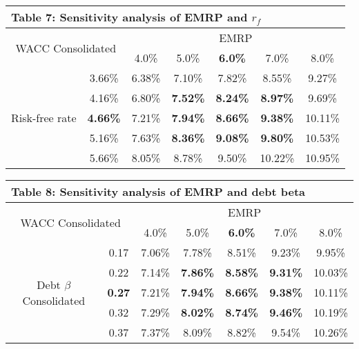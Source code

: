 \documentclass[AER]{AEA}
\begin{document}
\begin{spacing}{1.5}
\begin{table}[h!]
    \centering
    \begin{tabular}{|c|c|c|c|c|c|c|}
    \multicolumn{7}{l}{\textbf{Table 7: Sensitivity analysis of EMRP and $r_f$}}\\
    \hline
    \multicolumn{2}{|c|}{\multirow{2}{*}{WACC Consolidated}} & \multicolumn{5}{c|}{EMRP} \\ 
    \cline{3-7}
    \multicolumn{2}{|c|}{} & 4.0\% & 5.0\% & \textbf{6.0\%} & 7.0\% & 8.0\% \\ 
    \hline
    \multirow{5}{*}{Risk-free rate} & 3.66\% & 6.38\% & 7.10\% & 7.82\% & 8.55\% & 9.27\% \\ \cline{2-7}
    & 4.16\% & 6.80\% & \cellcolor{gray!25} \textbf{7.52\%} & \cellcolor{gray!25} \textbf{8.24\%} & \cellcolor{gray!25} \textbf{8.97\%} & 9.69\% \\ \cline{2-7}
    & \textbf{4.66\%} & 7.21\% & \cellcolor{gray!25} \textbf{7.94\%} & \cellcolor{gray!50} \textbf{8.66\%} & \cellcolor{gray!25} \textbf{9.38\%} & 10.11\% \\ \cline{2-7}
    & 5.16\% & 7.63\% & \cellcolor{gray!25} \textbf{8.36\%} & \cellcolor{gray!25} \textbf{9.08\%} & \cellcolor{gray!25} \textbf{9.80\%} & 10.53\% \\ \cline{2-7}
    & 5.66\% & 8.05\% & 8.78\% & 9.50\% & 10.22\% & 10.95\% \\ \hline
    \end{tabular}
\end{table}

\begin{table}[h!]
    \centering
    \begin{tabular}{|c|c|c|c|c|c|c|}
    \multicolumn{7}{l}{\textbf{Table 8: Sensitivity analysis of EMRP and debt beta}}\\
    \hline
    \multicolumn{2}{|c|}{\multirow{2}{*}{WACC Consolidated}} & \multicolumn{5}{c|}{EMRP} \\ 
    \cline{3-7}
    \multicolumn{2}{|c|}{} & 4.0\% & 5.0\% & \textbf{6.0\%} & 7.0\% & 8.0\% \\ 
    \hline
    \multirow{5}{*}{Debt $\beta$ Consolidated} 
    & 0.17 & 7.06\% & 7.78\% & 8.51\% & 9.23\% & 9.95\% \\ \cline{2-7}
    & 0.22 & 7.14\% & \cellcolor{gray!25} \textbf{7.86\%} & \cellcolor{gray!25} \textbf{8.58\%} & \cellcolor{gray!25} \textbf{9.31\%} & 10.03\% \\ \cline{2-7}
    & \textbf{0.27} & 7.21\% & \cellcolor{gray!25} \textbf{7.94\%} & \cellcolor{gray!50} \textbf{8.66\%} & \cellcolor{gray!25} \textbf{9.38\%} & 10.11\% \\ \cline{2-7}
    & 0.32 & 7.29\% & \cellcolor{gray!25} \textbf{8.02\%} & \cellcolor{gray!25} \textbf{8.74\%} & \cellcolor{gray!25} \textbf{9.46\%} & 10.19\% \\ \cline{2-7}
    & 0.37 & 7.37\% & 8.09\% & 8.82\% & 9.54\% & 10.26\% \\ \hline
    \end{tabular}
\end{table}

\end{spacing}
\end{document}
